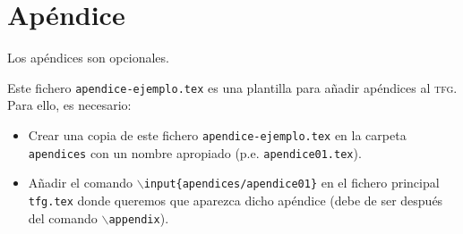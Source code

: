 
\chapter{Apéndice}\label{ap:apendiceA}

Los apéndices son opcionales.

Este fichero \texttt{apendice-ejemplo.tex} es una plantilla para añadir apéndices al \textsc{tfg}. Para ello, es necesario:
\begin{itemize}
  \item Crear una copia de este fichero \texttt{apendice-ejemplo.tex} en la carpeta \texttt{apendices} con un nombre apropiado (p.e. \texttt{apendice01.tex}).
  \item Añadir el comando \texttt{$\backslash$input\{apendices/apendice01\}} en el fichero principal \texttt{tfg.tex} donde queremos que aparezca dicho apéndice (debe de ser después del comando \texttt{$\backslash$appendix}).
\end{itemize}

\endinput
